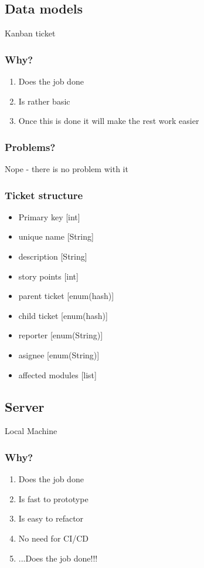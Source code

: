 \documentclass[12pt,a4paper,twoside]{article}
\begin{document}
\subsection{Data models}\label{MODEL:POC}
Kanban ticket
\subsubsection{Why?}
\begin{enumerate}
    \item Does the job done
    \item Is rather basic
    \item Once this is done it will make the rest work easier
\end{enumerate}
\subsubsection{Problems?}
Nope - there is no problem with it
\subsubsection{Ticket structure}
\begin{itemize}
  \item Primary key       [int]
  \item unique name       [String]
  \item description       [String]
  \item story points      [int]
  \item parent ticket     [enum(hash)]
  \item child ticket      [enum(hash)]
  \item reporter          [enum(String)]
  \item asignee           [enum(String)]
  \item affected modules  [list]
\end{itemize}

\subsection{Server}\label{SRV:POC}
Local Machine
\subsubsection{Why?}
\begin{enumerate}
    \item Does the job done
    \item Is fast to prototype
    \item Is easy to refactor
    \item No need for CI/CD
    \item ...Does the job done!!!
\end{enumerate}
\end{document}
